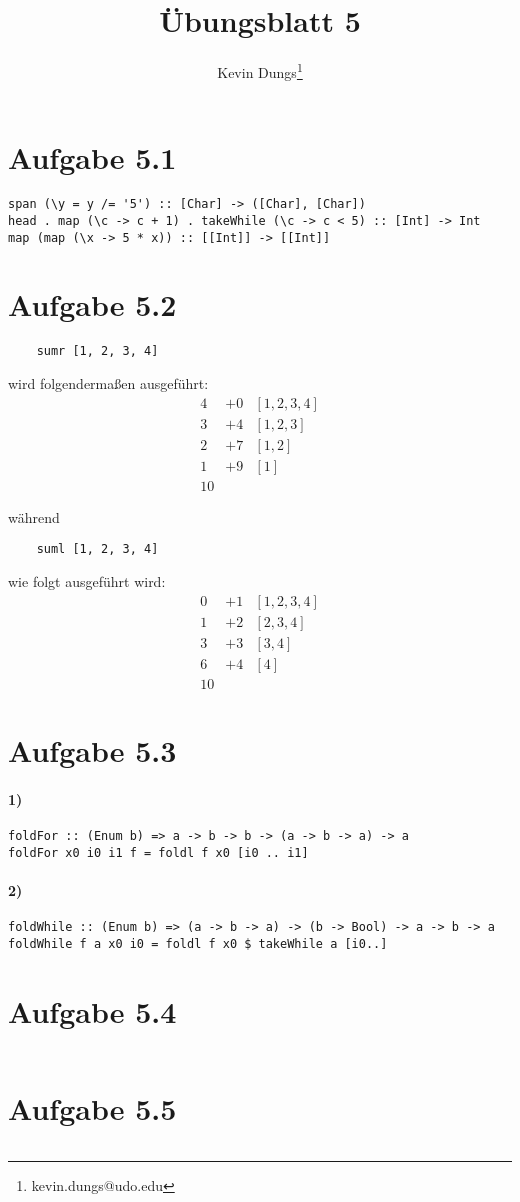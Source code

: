 \documentclass[a4paper]{scrartcl}
\title{Übungsblatt 5}
\author{Kevin Dungs\thanks{kevin.dungs@udo.edu}}
\begin{document}
\maketitle


\section*{Aufgabe 5.1}
\begin{verbatim}
span (\y = y /= '5') :: [Char] -> ([Char], [Char])
head . map (\c -> c + 1) . takeWhile (\c -> c < 5) :: [Int] -> Int
map (map (\x -> 5 * x)) :: [[Int]] -> [[Int]]
\end{verbatim}


\section*{Aufgabe 5.2}
\begin{verbatim}
    sumr [1, 2, 3, 4]
\end{verbatim}
wird folgendermaßen ausgeführt:
\begin{align*}
    4 &+ 0 & [1, 2, 3, 4] \\
    3 &+ 4 & [1, 2, 3] \\
    2 &+ 7 & [1, 2] \\
    1 &+ 9 & [1] \\
    10
\end{align*}

während
\begin{verbatim}
    suml [1, 2, 3, 4]
\end{verbatim}
wie folgt ausgeführt wird:
\begin{align*}
    0 &+ 1 & [1, 2, 3, 4] \\
    1 &+ 2 & [2, 3, 4] \\
    3 &+ 3 & [3, 4] \\
    6 &+ 4 & [4] \\
    10
\end{align*}


\section*{Aufgabe 5.3}
\paragraph{1)}
\begin{verbatim}
foldFor :: (Enum b) => a -> b -> b -> (a -> b -> a) -> a
foldFor x0 i0 i1 f = foldl f x0 [i0 .. i1]
\end{verbatim}

\paragraph{2)}
\begin{verbatim}
foldWhile :: (Enum b) => (a -> b -> a) -> (b -> Bool) -> a -> b -> a
foldWhile f a x0 i0 = foldl f x0 $ takeWhile a [i0..]
\end{verbatim}


\section*{Aufgabe 5.4}
\inputminted{haskell}{binary.hs }


\section*{Aufgabe 5.5}
\inputminted{haskell}{zipper.hs}
\end{document}
